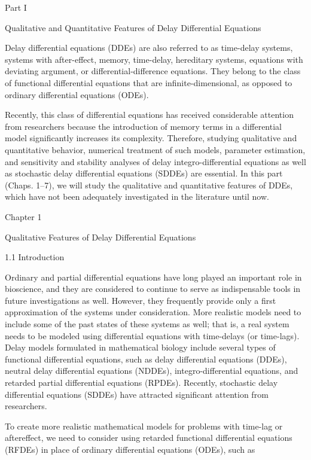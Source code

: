 \documentclass[12pt]{article}
\begin{document}
Part I

Qualitative and Quantitative Features of Delay Differential Equations

Delay differential equations (DDEs) are also referred to as time-delay systems, systems with after-effect, memory, time-delay, hereditary 
systems, equations with deviating argument, or differential-difference equations. They belong to the class of functional differential 
equations that are infinite-dimensional, as opposed to ordinary differential equations (ODEs).

Recently, this class of differential equations has received considerable attention from researchers because the introduction of memory terms 
in a differential model significantly increases its complexity. Therefore, studying qualitative and quantitative behavior, numerical 
treatment of such models, parameter estimation, and sensitivity and stability analyses of delay integro-differential equations as well as 
stochastic delay differential equations (SDDEs) are essential. In this part (Chaps. 1–7), we will study the qualitative and quantitative 
features of DDEs, which have not been adequately investigated in the literature until now.

Chapter 1

Qualitative Features of Delay Differential Equations

1.1 Introduction

Ordinary and partial differential equations have long played an important role in bioscience, and they are considered to continue to serve as 
indispensable tools in future investigations as well. However, they frequently provide only a first approximation of the systems under 
consideration. More realistic models need to include some of the past states of these systems as well; that is, a real system needs to be 
modeled using differential equations with time-delays (or time-lags). Delay models formulated in mathematical biology include several types 
of functional differential equations, such as delay differential equations (DDEs), neutral delay differential equations (NDDEs), 
integro-differential equations, and retarded partial differential equations (RPDEs). Recently, stochastic delay differential equations 
(SDDEs) have attracted significant attention from researchers.

To create more realistic mathematical models for problems with time-lag or aftereffect, we need to consider using retarded functional 
differential equations (RFDEs) in place of ordinary differential equations (ODEs), such as
\end{document}
